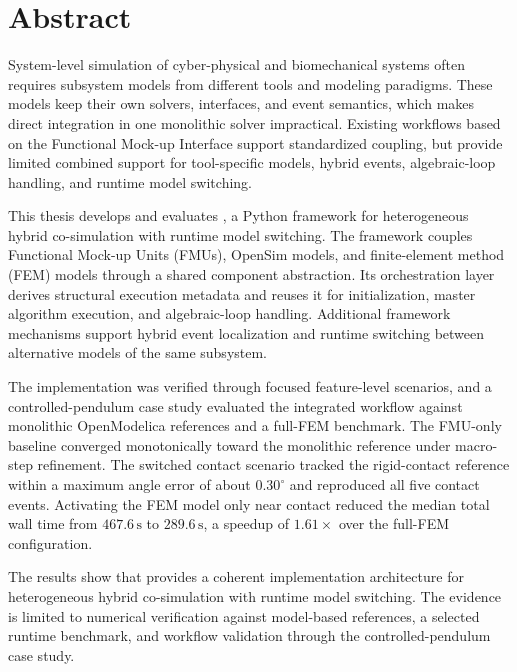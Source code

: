 \chapter*{Abstract}

System-level simulation of cyber-physical and biomechanical systems often requires subsystem models from different tools and modeling paradigms.
These models keep their own solvers, interfaces, and event semantics, which makes direct integration in one monolithic solver impractical.
Existing workflows based on the Functional Mock-up Interface support standardized coupling, but provide limited combined support for tool-specific models, hybrid events, algebraic-loop handling, and runtime model switching.

This thesis develops and evaluates \syssimx{}, a Python framework for heterogeneous hybrid co-simulation with runtime model switching.
The framework couples Functional Mock-up Units (FMUs), OpenSim models, and finite-element method (FEM) models through a shared component abstraction.
Its orchestration layer derives structural execution metadata and reuses it for initialization, master algorithm execution, and algebraic-loop handling.
Additional framework mechanisms support hybrid event localization and runtime switching between alternative models of the same subsystem.

The implementation was verified through focused feature-level scenarios, and a controlled-pendulum case study evaluated the integrated workflow against monolithic OpenModelica references and a full-FEM benchmark.
The FMU-only baseline converged monotonically toward the monolithic reference under macro-step refinement.
The switched contact scenario tracked the rigid-contact reference within a maximum angle error of about $0.30^\circ$ and reproduced all five contact events.
Activating the FEM model only near contact reduced the median total wall time from $467.6\,\mathrm{s}$ to $289.6\,\mathrm{s}$, a speedup of $1.61\times$ over the full-FEM configuration.

The results show that \syssimx{} provides a coherent implementation architecture for heterogeneous hybrid co-simulation with runtime model switching.
The evidence is limited to numerical verification against model-based references, a selected runtime benchmark, and workflow validation through the controlled-pendulum case study.